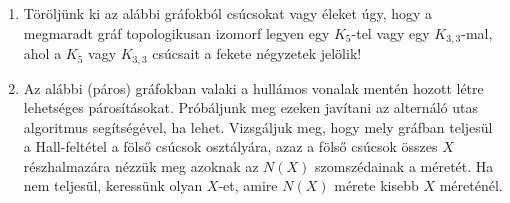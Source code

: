 \documentclass[a4paper, 12pt]{article}
\begin{document}
\begin{enumerate}
            \item Töröljünk ki az alábbi gráfokból csúcsokat vagy éleket úgy, hogy a megmaradt gráf topologikusan izomorf legyen egy $K_5$-tel vagy egy $K_{3,3}$-mal, ahol a $K_5$ vagy $K_{3,3}$ csúcsait a fekete négyzetek jelölik!
            \begin{figure}[ht]
                \centering
                \begin{subfigure}{0.2\textwidth}
                    \centering
                    
                \end{subfigure}
                \begin{subfigure}{0.2\textwidth}
                    \centering
                    
                \end{subfigure}
                \begin{subfigure}{0.2\textwidth}
                    \centering
                    
                \end{subfigure}
                \begin{subfigure}{0.2\textwidth}
                    \centering
                    
                \end{subfigure}
            \end{figure}

            \item Az alábbi (páros) gráfokban valaki a hullámos vonalak mentén hozott létre lehetséges párosításokat. Próbáljunk meg ezeken javítani az alternáló utas algoritmus segítségével, ha lehet. Vizsgáljuk meg, hogy mely gráfban teljesül a Hall-feltétel a fölső csúcsok osztályára, azaz a fölső csúcsok összes $X$ részhalmazára nézzük meg azoknak az $N(X)$ szomszédainak a méretét. Ha nem teljesül, keressünk olyan $X$-et, amire $N(X)$ mérete kisebb $X$ méreténél.
            \begin{figure}[ht]
                \centering
                \begin{subfigure}{0.3\textwidth}
                    \centering
                    
                \end{subfigure}
                \begin{subfigure}{0.3\textwidth}
                    \centering
                    
                \end{subfigure}
                \begin{subfigure}{0.3\textwidth}
                    \centering
                    
                \end{subfigure}
            \end{figure}


\end{enumerate}
\end{document}
